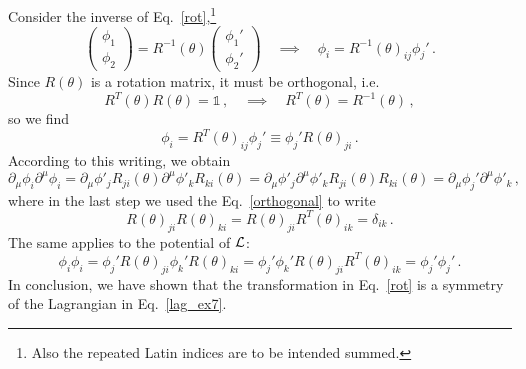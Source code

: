 \begin{sol}
    Consider the inverse of Eq.~\eqref{rot},\footnote{Also the repeated Latin indices are to be intended summed.}
    \begin{equation}
        \begin{pmatrix} \phi_1 \\ \phi_2 \end{pmatrix} = R^{-1}(\theta) \begin{pmatrix} \phi_1' \\ \phi_2' \end{pmatrix} \quad \implies \quad \phi_i = R^{-1}(\theta)_{ij}\phi_j' \, .
    \end{equation}
    Since $R(\theta)$ is a rotation matrix, it must be orthogonal, i.e.
    \begin{equation}
    \label{orthogonal}
        R^T(\theta) R(\theta) = \mathbb{1} \, ,
        \quad \implies \quad 
        R^T(\theta) = R^{-1}(\theta) \, ,
    \end{equation}
    so we find
    \begin{equation}
        \phi_i = R^{T}(\theta)_{ij}\phi_j' \equiv \phi_j' R(\theta)_{ji} \, .
    \end{equation}
    According to this writing, we obtain
    \begin{equation}
        \partial_\mu \phi_i \partial^\mu \phi_i 
        = \partial_\mu \phi'_j R_{ji}(\theta) \partial^\mu \phi'_k R_{ki}(\theta) 
        = \partial_\mu \phi'_j \partial^\mu \phi'_k R_{ji}(\theta) R_{ki}(\theta) 
        = \partial_\mu \phi_j' \partial^\mu \phi'_k \, ,
    \end{equation}
    where in the last step we used the Eq.~\eqref{orthogonal} to write
    \begin{equation}
        R(\theta)_{ji} R(\theta)_{ki} = R(\theta)_{ji} R^T(\theta)_{ik} = \delta_{ik} \, .
    \end{equation} 
    The same applies to the potential of $\mathcal{L}$:
    \begin{equation}
        \phi_i \phi_i = \phi_j' R(\theta)_{ji} \phi_k' R(\theta)_{ki} = \phi_j' \phi_k' R(\theta)_{ji} R^T(\theta)_{ik} = \phi_j' \phi_j'\,.
    \end{equation}
    In conclusion, we have shown that the transformation in Eq.~\eqref{rot} is a symmetry of the Lagrangian in Eq.~\eqref{lag_ex7}.
    

\end{sol}
